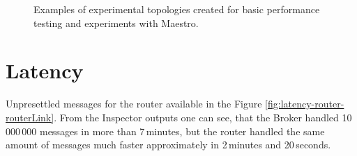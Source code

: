 \begin{figure}[h]
	\centering
	\begin{minipage}{0.49\linewidth}
	\end{minipage}
	\begin{minipage}{0.49\linewidth}
	\end{minipage}
	\caption[Examples of experimental topologies created for basic performance testing and experiments with Maestro.]{Examples of experimental topologies created for basic performance testing and experiments with Maestro.}\label{fig:routerLink-throughput}
\end{figure}

\section{Latency}

Unpresettled messages for the router available in the Figure \ref{fig:latency-router-routerLink}. From the Inspector outputs one can see, that the Broker handled 10\,000\,000 messages in more than 7\,minutes, but the router handled the same amount of messages much faster approximately in 2\,minutes and 20\,seconds.

